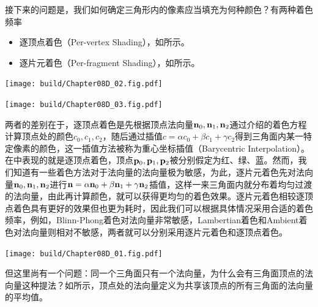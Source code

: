 接下来的问题是，我们如何确定三角形内的像素应当填充为何种颜色？有两种着色频率
\begin{itemize}
    \item 逐顶点着色（Per-vertex Shading），如所示。
    \item 逐片元着色（Per-fragment Shading），如所示。
\end{itemize}
\begin{Figure}[着色频率]
    \begin{FigureSub}[逐顶点着色]
        \texttt{[image: build/Chapter08D\_02.fig.pdf]}
    \end{FigureSub}
    \hspace{0.5cm}
    \begin{FigureSub}[逐片元着色]
        \texttt{[image: build/Chapter08D\_03.fig.pdf]}
    \end{FigureSub}
\end{Figure}
两者的差别在于，逐顶点着色是先根据顶点法向量$\vb{n}_0,\vb{n}_1,\vb{n}_2$通过介绍的着色方程计算顶点处的颜色$c_0,c_1,c_2$，随后通过插值$c=\alpha c_0+\beta c_1+\gamma c_2$得到三角面内某一特定像素的颜色，这一插值方法被称为重心坐标插值（Barycentric Interpolation）。在中表现的就是逐顶点着色，顶点$\vb{p}_0,\vb{p}_1,\vb{p}_2$被分别假定为红、绿、蓝。然而，我们知道有一些着色方法对于法向量的法向量极为敏感，为此，逐片元着色先对法向量$\vb{n}_0,\vb{n}_1,\vb{n}_2$进行$\vb{n}=\alpha\vb{n}_0+\beta\vb{n}_1+\gamma\vb{n}_2$插值，这样一来三角面内就分布着均匀过渡的法向量，由此再计算颜色，就可以获得更均匀的着色效果。逐片元着色相较逐顶点着色具有更好的效果但也更为耗时，因此我们可以根据具体情况采用合适的着色频率，例如，Blinn-Phong着色对法向量非常敏感，Lambertian着色和Ambient着色对法向量则相对不敏感，两者就可以分别采用逐片元着色和逐顶点着色。

\begin{Figure}[顶点处的法向量]
    \texttt{[image: build/Chapter08D\_01.fig.pdf]}
\end{Figure}

但这里尚有一个问题：同一个三角面只有一个法向量，为什么会有三角面顶点的法向量这种提法？如所示，顶点处的法向量定义为共享该顶点的所有三角面的法向量的平均值。